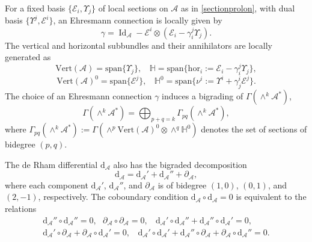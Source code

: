 \documentclass[12pt,letterpaper]{article}
\newcommand{\A}{\mathscr{A}}
\numberwithin{equation}{section}
\begin{document}
For a fixed basis  $\{ \mathcal{E}_i, \Upsilon_j \}$ of local sections on $\A$ as in \eqref{sectionprolon},  
with dual basis $\{\Upsilon^j,\mathcal{E}^i\}$, 
an Ehresmann connection is locally given by
\begin{equation}
\gamma=\operatorname{Id}_\A-\mathcal{E}^i\otimes(\mathcal{E}_i-\gamma^j_i\Upsilon_j).
\end{equation}
The vertical and horizontal subbundles and their annihilators are locally generated as
$$ \mathrm{Vert}(\mathscr{A})= \mathrm{span}\{\Upsilon_j \}, \ \ \ \   \mathbb{H}=  \mathrm{span}\{\mathrm{hor}_{i}:=\mathcal{E}_i-\gamma_i^{j}\Upsilon_j \} , $$
$$ \mathrm{Vert}(\mathscr{A})^{0}= \mathrm{span}\{\mathcal{E}^{j} \}, \ \ \ \   \mathbb{H}^{0}=  \mathrm{span}\{\nu^{i}:=\Upsilon^{i}+\gamma_j^{i}\mathcal{E}^{j} \}.$$
The choice of an Ehresmann connection $\gamma$ induces a bigrading of $\Gamma(\wedge^k \mathscr{A}^*)$,
\begin{equation}
\Gamma(\wedge^k \mathscr{A}^*) = \bigoplus_{p+q=k} \Gamma_{pq}(\wedge^k \mathscr{A}^* ),\label{bigrad}
\end{equation}
where $\Gamma_{pq}(\wedge^k \mathscr{A}^*):=\Gamma(\wedge^p\mathrm{Vert}(\mathscr{A})^{0}\otimes\wedge^q\mathbb{H}^0)$ 
denotes the set of sections of bidegree $(p,q)$.

The de Rham differential $\mathrm{d}_\mathscr{A}$ also has the bigraded decomposition
\begin{equation}
\mathrm{d}_\mathscr{A}= \mathrm{d}_\mathscr{A}'+\mathrm{d}_\mathscr{A}''+\partial_\mathscr{A},\label{decom-extd}
\end{equation}
where each component $\mathrm{d}_\mathscr{A}'$, $\mathrm{d}_\mathscr{A}''$, and $\partial_\mathscr{A}$
is of bidegree $(1,0)$, $(0,1)$, and $(2,-1)$, respectively. 
The coboundary condition $\mathrm{d}_\mathscr{A} \circ \mathrm{d}_\mathscr{A} =0 $ is equivalent to the relations
\begin{eqnarray*}
\mathrm{d}_\mathscr{A}''\circ \mathrm{d}_\mathscr{A}'' = 0, \ \ \ \partial_\mathscr{A}\circ \partial_\mathscr{A} =0, \ \ \ \ \mathrm{d}_\mathscr{A}'\circ \mathrm{d}_\mathscr{A}''+\mathrm{d}_\mathscr{A}''\circ\mathrm{d}_\mathscr{A}'=0,\\
\mathrm{d}_\mathscr{A}'\circ \partial_\mathscr{A}+  \partial_\mathscr{A}\circ \mathrm{d}_\mathscr{A}'=0, \ \ \ \ \mathrm{d}_\mathscr{A}'\circ \mathrm{d}_\mathscr{A}'+ \mathrm{d}_\mathscr{A}''\circ\partial_\mathscr{A}  + \partial_\mathscr{A} \circ \mathrm{d}_\mathscr{A}''=0.
\end{eqnarray*}
\end{document}
